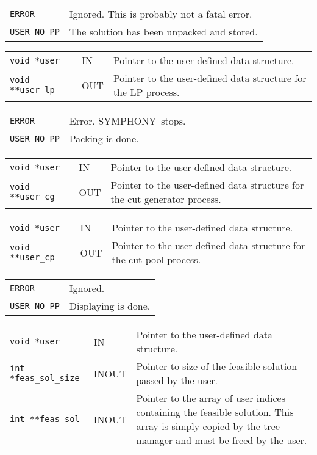 \documentclass[twoside,11pt]{article}
\begin{document}
{\newpage
\clearpage
\samepage \begin{tabular}{lp{300pt}}
{\tt ERROR} & Ignored. This is probably not a fatal error.\\ 
{\tt USER\_NO\_PP} & The solution has been unpacked and stored. \\ 
\end{tabular}
}

{\newpage
\clearpage
\samepage \begin{tabular}{llp{275pt}}
{\tt void *user} & IN & Pointer to the user-defined data structure. \\ 
{\tt void **user\_lp} & OUT & Pointer to the user-defined data
structure for the LP process. \\ 
\end{tabular}
}

{\newpage
\clearpage
\samepage \begin{tabular}{lp{300pt}}
{\tt ERROR} & Error. {\sc SYMPHONY}\ stops. \\ 
{\tt USER\_NO\_PP} & Packing is done. \\ 
\end{tabular}
}

{\newpage
\clearpage
\samepage \begin{tabular}{llp{275pt}}
{\tt void *user} & IN & Pointer to the user-defined data structure. \\ 
{\tt void **user\_cg} & OUT & Pointer to the user-defined data
structure for the cut generator process. \\ 
\end{tabular}
}

{\newpage
\clearpage
\samepage \begin{tabular}{llp{275pt}}
{\tt void *user} & IN & Pointer to the user-defined data structure. \\ 
{\tt void **user\_cp} & OUT & Pointer to the user-defined data
structure for the cut pool process. \\ 
\end{tabular}
}

{\newpage
\clearpage
\samepage \begin{tabular}{lp{300pt}}
{\tt ERROR} & Ignored. \\ 
{\tt USER\_NO\_PP} & Displaying is done. \\ 
\end{tabular}
}

{\newpage
\clearpage
\samepage \begin{tabular}{llp{245pt}}
{\tt void *user} & IN & Pointer to the user-defined data structure. \\ 
{\tt int *feas\_sol\_size} & INOUT & Pointer to size of the feasible
solution passed by the user. \\ 
{\tt int **feas\_sol} & INOUT & Pointer to the array of user indices
containing the feasible solution. This array is simply copied by the tree
manager and must be freed by the user. \\ 
\end{tabular}
}
\end{document}
